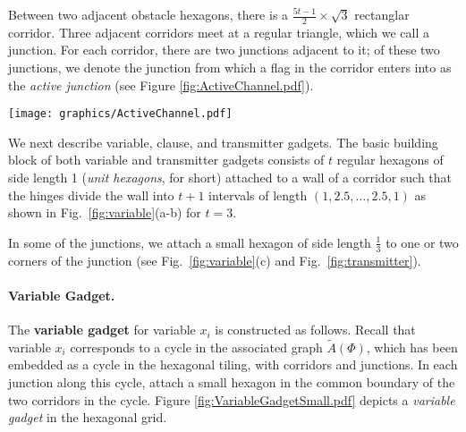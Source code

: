Between two adjacent obstacle hexagons, there is a $\frac{5t-1}{2}\times \sqrt{3}$ rectanglar corridor.  %
Three adjacent corridors meet at a regular triangle, which we call a junction. 
For each corridor, there are two junctions adjacent to it; of these two junctions, we denote the junction from which a flag in the corridor enters into as the \textit{active junction} (see Figure \ref{fig:ActiveChannel.pdf}).

\begin{minipage}{\linewidth}
\begin{center}
\texttt{[image: graphics/ActiveChannel.pdf]}
\label{fig:ActiveChannel.pdf}
\end{center}
\end{minipage}

We next describe variable, clause, and transmitter gadgets.
The basic building block of both variable and transmitter gadgets consists of $t$ regular hexagons of side length 1 (\emph{unit hexagons}, for short) attached to a wall of a corridor such that the hinges divide the wall into $t+1$ intervals of length $(1,2.5,\ldots ,2.5,1)$ as shown in Fig.~\ref{fig:variable}(a-b) for $t=3$. 

In some of the junctions, we attach a small hexagon of side length $\frac{1}{3}$ to one or two corners of the junction (see Fig.~\ref{fig:variable}(c) and Fig.~\ref{fig:transmitter}). 

\paragraph{Variable Gadget.}
The {\bf variable gadget} for variable $x_i$ is constructed as follows. 
Recall that variable $x_i$ corresponds to a cycle in the associated graph $\tilde{A}(\Phi)$, which has been embedded as a cycle in the hexagonal tiling, with corridors and junctions. 
In each junction along this cycle, attach a small hexagon in the common boundary of the two corridors in the cycle. 
Figure \ref{fig:VariableGadgetSmall.pdf} depicts a \textit{variable gadget} in the hexagonal grid.

